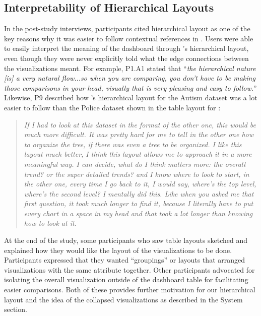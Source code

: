 \subsection{Interpretability of Hierarchical Layouts}
\par In the post-study interviews, participants cited hierarchical layout as one of the key reasons why it was easier to follow contextual references in \system. Users were able to easily interpret the meaning of the dashboard through \system's hierarchical layout, even though they were never explicitly told what the edge connections between the visualizations meant. For example, P1.A1 stated that ``\textit{the hierarchical nature [is] a very natural flow...so when you are comparing, you don't have to be making those comparisons in your head, visually that is very pleasing and easy to follow.}'' %
Likewise, P9 described how \system's hierarchical layout for the Autism dataset was a lot easier to follow than the Police dataset shown in the table layout for \cluster:
\begin{quote}
\textit{If I had to look at this dataset in the format of the other one, this would be much more difficult. It was pretty hard for me to tell in the other one how to organize the tree, if there was even a tree to be organized. I like this layout much better, I think this layout allows me to approach it in a more meaningful way. I can decide, what do I think matters more: the overall trend? or the super detailed trends? and I know where to look to start, in the other one, every time I go back to it, I would say, where's the top level, where's the second level? I mentally did this. Like when you asked me that first question, it took much longer to find it, because I literally have to put every chart in a space in my head and that took a lot longer than knowing how to look at it.}
\end{quote}
At the end of the study, some participants who saw table layouts sketched and explained how they would like the layout of the visualizations to be done. Participants expressed that they wanted ``groupings'' or layouts that arranged visualizations with the same attribute together. Other participants advocated for isolating the overall visualization outside of the dashboard table for facilitating easier comparisons. Both of these provides further motivation for our hierarchical layout and the idea of the collapsed visualizations as described in the System section.%
